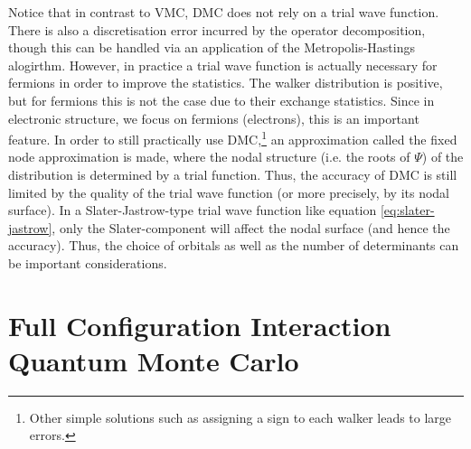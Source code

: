 Notice that in contrast to \gls{VMC}, \gls{DMC} does not rely on a trial wave function. There is also a discretisation error incurred by the operator decomposition, though this can be handled via an application of the Metropolis-Hastings alogirthm.\cite{thijssenComputational2007}
However, in practice a trial wave function is actually necessary for fermions in order to improve the statistics. The walker distribution is positive, but for fermions this is not the case due to their exchange statistics. Since in electronic structure, we focus on fermions (electrons), this is an important feature. In order to still practically use DMC,\footnote{Other simple solutions such as assigning a sign to each walker leads to large errors.} an approximation called the fixed node approximation is made, where the nodal structure (i.e. the roots of $\Psi$) of the distribution is determined by a trial function. Thus, the accuracy of DMC is still limited by the quality of the trial wave function (or more precisely, by its nodal surface). In a Slater-Jastrow-type trial wave function like equation \ref{eq:slater-jastrow}, only the Slater-component will affect the nodal surface (and hence the accuracy). Thus, the choice of orbitals as well as the number of determinants can be important considerations.




\section{Full Configuration Interaction Quantum Monte Carlo}
\label{sec:fciqmc}

